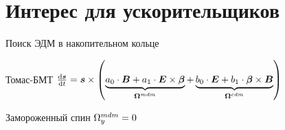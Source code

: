 \documentclass[14pt]{beamer}
\newcommand{\Wedm}{\W^{edm}}
\newcommand{\Wmdm}{\W^{mdm}}
\begin{document}

\section{Интерес для ускорительщиков}
\begin{frame}{Поиск ЭДМ в накопительном кольце}
	\begin{block}{Томас-БМТ}
		$\frac{\rd \vec s}{\rd t} = \vec s \times \bkt{\underbrace{a_0\cdot\vec B + a_1\cdot\vec E\times\vec\beta}_{\vec\Wmdm} + \underbrace{b_0\cdot\vec E + b_1\cdot\vec\beta\times\vec B}_{\vec\Wedm}}$
	\end{block}
	\begin{block}{Замороженный спин}
		$\Wmdm_y = 0$
	\end{block}
\end{frame}
\end{document}
